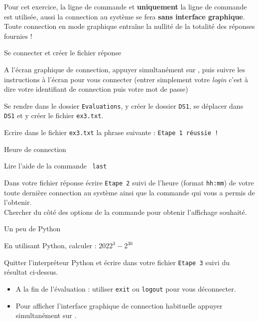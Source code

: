 \documentclass[11pt,a4paper]{article}
\begin{document}
\begin{tcolorbox}[title=\textcolor{black}{\danger \; Attention !},colbacktitle=lightgray]
     Pour cet exercice, la ligne de commande et \textbf{uniquement} la ligne de commande est utilisée, aussi la connection au système se fera \textbf{sans interface graphique}. Toute connection en mode graphique entraîne la nullité de la totalité des réponses fournies !
\end{tcolorbox}
\QListe
    \item Se connecter et créer le fichier réponse
\SQListe
\item A l'écran graphique de connection, appuyer simultanément sur , puis suivre les instructions à l'écran pour vous connecter (entrer simplement votre \textit{login} c'est à dire votre identifiant de connection puis votre mot de passe)
\item Se rendre dans le dossier {\tt Evaluations}, y créer le dossier {\tt DS1}, se déplacer dans {\tt DS1} et y créer le fichier {\tt ex3.txt}.
\item Ecrire dans le fichier {\tt ex3.txt} la phrase suivante : {\tt Etape 1 réussie !}
\FinListe
    \item Heure de connection
\SQListe
\item Lire l'aide de la commande  {\tt last}
\item Dans votre fichier réponse écrire {\tt Etape 2} suivi de l'heure (format {\tt hh:mm}) de votre toute dernière connection au système ainsi que la commande qui vous a permis de l'obtenir.\\
    \aide \; Chercher du côté des options de la commande pour obtenir l'affichage souhaité.
\FinListe
\item Un peu de Python
\SQListe
    \item En utilisant Python, calculer : $ 2022^{3}-2^{30}$
    \item Quitter l'interpréteur Python et écrire dans votre fichier {\tt Etape 3} suivi du résultat ci-dessus.
\FinListe

\FinListe
\begin{tcolorbox}[title=\textcolor{black}{\faHandPointRight \; Remarques},colbacktitle=lightgray]
    \begin{itemize}
        \item A la fin de l'évaluation : utiliser {\tt exit} ou {\tt logout} pour vous déconnecter.
        \item Pour afficher l'interface graphique de connection habituelle appuyer simultanément sur .
    \end{itemize}
\end{tcolorbox}
\end{document}
